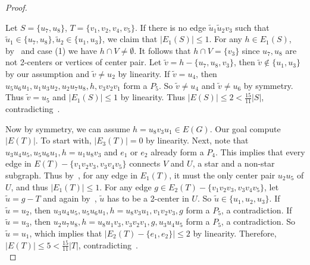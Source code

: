 \documentclass[10pt,a4paper]{amsart}
\begin{document}
\begin{proof}
\begin{figure}[h]
\end{figure}

Let $S = \{u_7, u_8\}$, $T = \{v_1, v_2,v_4,v_5\}$.	If there is no edge $\tilde{u}_1\tilde{u}_2v_3$ such that $\tilde{u}_1\in \{u_7, u_8\}, \tilde{u}_2\in\{u_1, u_3\}$, we claim that $|E_1(S)|\le 1$. For any $h\in E_1(S)$,  by~ and case (1) we have $h\cap V \neq \emptyset$. It follows that $h\cap V = \{v_3\}$ since $u_7, u_8$ are not 2-centers or vertices of center pair. 
Let $\tilde{v} = h-\{u_7,u_8,v_3\}$, then $\tilde{v}\notin \{u_1, u_3\}$ by our assumption and $\tilde{v}\neq u_2$ by linearity. If $\tilde{v}=u_4$, then $u_5u_6u_1, u_1u_3u_2,u_2u_7u_8, h, v_3v_2v_1$ form a $P_5$. So $\tilde{v}\neq u_4$ and $\tilde{v}\neq u_6$ by symmetry. Thus $\tilde{v} = u_5$ and $|E_1(S)|\le 1$ by linearity. Thus $|E(S)|\leq 2<\frac{15}{11}|S|$, contradicting~.
	
Now by symmetry, we can assume $h =u_8v_3u_1\in E (G)$. Our goal compute $|E(T)|$. To start with, $|E_3(T)|=0$ by linearity. Next, note that $u_3u_4u_5,u_5u_6u_1,h=u_1u_8v_3$ and $e_1$ or $e_2$ already form a $P_4$. This implies that every edge in $E(T)-\{v_1v_2v_3,v_3v_4v_5\}$ connects $V$ and $U$, a star and a non-star subgraph. Thus by~,
for any edge in $E_1(T)$, it must the only center pair $u_2u_5$ of $U$, and thus $|E_1(T)|\le 1$. 
For any edge $g\in E_2(T)-\{v_1v_2v_3,v_3v_4v_5\}$, let $\tilde{u}=g-T$ and again by~, $\tilde{u}$ has to be a 2-center in $U$. So $\tilde{u}\in \{u_1,u_2,u_3\}$. If $\tilde{u}=u_2$, then $u_3u_4u_5,u_5u_6u_1,h=u_8v_3u_1,v_1v_2v_3,g$ form a $P_5$, a contradiction. If $\tilde{u} = u_3$, then $u_2u_7u_8, h=u_8u_1v_3, v_3v_2v_1, g, u_3u_4u_5$ form a $P_5$, a contradiction. So $\tilde{u} = u_1$, which implies that $|E_2(T)-\{e_1,e_2\}|\le 2$ by linearity. Therefore, $|E(T)|\le 5<\frac{15}{11}|T|$, contradicting~.\\
    

\end{proof}
\end{document}
